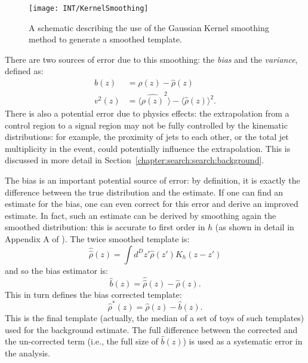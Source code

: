 \begin{figure}
\centering
\texttt{[image: INT/KernelSmoothing]}
\caption{A schematic describing the use of the Gaussian Kernel smoothing method to generate a smoothed template.}
\label{fig:search:substructure:smoothing}
\end{figure}


There are two sources of error due to this smoothing: the \textit{bias} and the \textit{variance}, defined as:
%
\begin{align}
b(z) &= \rho(z) - \hat{\rho}(z)\nonumber\\
v^2(z) &= \langle \hat{\rho(z)}^2 \rangle  - \langle \hat{\rho}(z) \rangle^2.
\end{align}
%
There is also a potential error due to  physics effects: the extrapolation from a control region to a signal region may not be fully controlled by the kinematic distributions: for example, the proximity of jets to each other, or the total jet multiplicity in the event, could potentially influence the extrapolation. This is discussed in more detail in Section~\ref{chapter:search:search:background}. 

The bias is an important potential source of error: by definition, it is exactly the difference between the true distribution and the estimate. If one can find an estimate for the bias, one can even correct for this error and derive an improved estimate. In fact, such an estimate can be derived by smoothing again the smoothed distribution: this is accurate to first order in $h$ (as shown in detail in Appendix A of \cite{MassTemplates}). The twice smoothed template is:
%
\begin{equation}
\hat{\hat{\rho}}(z) = \int d^D z' \hat{\rho}(z') K_h (z-z')
\end{equation}
% 
and so the bias estimator is:
%
\begin{equation}
\hat{b}(z) = \hat{\hat{\rho}}(z) - \hat{\rho}(z).
\end{equation}
%
This in turn defines the bias corrected template:
%
\begin{equation}
\hat{\rho}^*(z) = \hat{\rho}(z) - \hat{b}(z).
\end{equation}
%
This is the final template (actually, the median of a set of toys of such templates) used for the background estimate. The full difference between the corrected and the un-corrected term (i.e., the full size of $\hat{b}(z)$) is used as a systematic error in the analysis.

